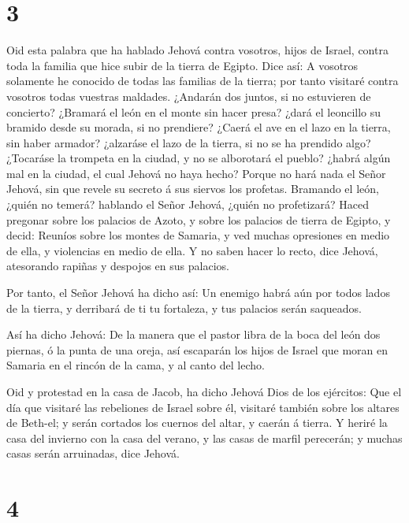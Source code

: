 \hypertarget{section-2}{%
\section{3}\label{section-2}}

 Oid esta palabra que ha hablado Jehová contra vosotros,
hijos de Israel, contra toda la familia que hice subir de la tierra de
Egipto. Dice así:  A vosotros solamente he conocido de todas
las familias de la tierra; por tanto visitaré contra vosotros todas
vuestras maldades.  ¿Andarán dos juntos, si no estuvieren de
concierto?  ¿Bramará el león en el monte sin hacer presa?
¿dará el leoncillo su bramido desde su morada, si no prendiere?
 ¿Caerá el ave en el lazo en la tierra, sin haber armador?
¿alzaráse el lazo de la tierra, si no se ha prendido algo? 
¿Tocaráse la trompeta en la ciudad, y no se alborotará el pueblo? ¿habrá
algún mal en la ciudad, el cual Jehová no haya hecho? 
Porque no hará nada el Señor Jehová, sin que revele su secreto á sus
siervos los profetas.  Bramando el león, ¿quién no temerá?
hablando el Señor Jehová, ¿quién no profetizará?  Haced
pregonar sobre los palacios de Azoto, y sobre los palacios de tierra de
Egipto, y decid: Reuníos sobre los montes de Samaria, y ved muchas
opresiones en medio de ella, y violencias en medio de ella.
 Y no saben hacer lo recto, dice Jehová, atesorando rapiñas
y despojos en sus palacios.

 Por tanto, el Señor Jehová ha dicho así: Un enemigo habrá
aún por todos lados de la tierra, y derribará de ti tu fortaleza, y tus
palacios serán saqueados.

 Así ha dicho Jehová: De la manera que el pastor libra de
la boca del león dos piernas, ó la punta de una oreja, así escaparán los
hijos de Israel que moran en Samaria en el rincón de la cama, y al canto
del lecho.

 Oid y protestad en la casa de Jacob, ha dicho Jehová Dios
de los ejércitos:  Que el día que visitaré las rebeliones
de Israel sobre él, visitaré también sobre los altares de Beth-el; y
serán cortados los cuernos del altar, y caerán á tierra.  Y
heriré la casa del invierno con la casa del verano, y las casas de
marfil perecerán; y muchas casas serán arruinadas, dice Jehová.

\hypertarget{section-3}{%
\section{4}\label{section-3}}

